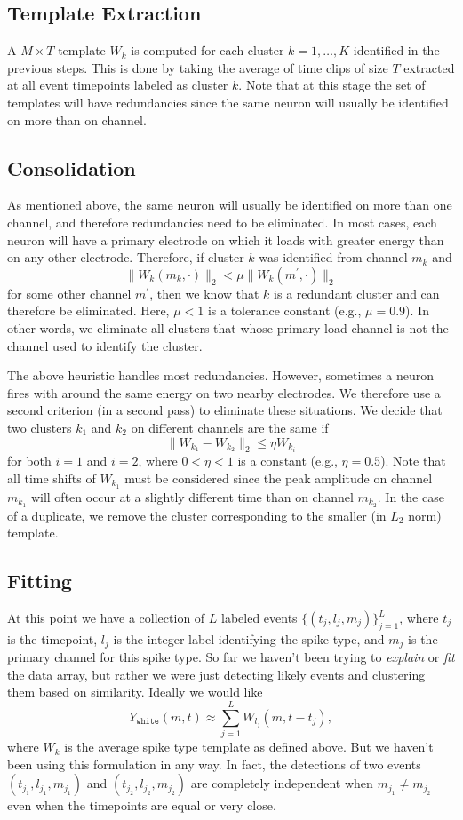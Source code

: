 \documentclass[hidelinks,10pt]{article}
\begin{document}
\subsection {Template Extraction}

A $M\times T$ template $W_k$ is computed for each cluster $k=1,\dots,K$ identified in the previous steps. This is done by taking the average of time clips of size $T$ extracted at all event timepoints labeled as cluster $k$. Note that at this stage the set of templates will have redundancies since the same neuron will usually be identified on more than on channel.

\subsection {Consolidation}

As mentioned above, the same neuron will usually be identified on more than one channel, and therefore redundancies need to be eliminated. In most cases, each neuron will have a primary electrode on which it loads with greater energy than on any other electrode. Therefore, if cluster $k$ was identified from channel $m_k$ and 
$$\|W_k(m_k,\cdot)\|_2<\mu \|W_k(m^\prime,\cdot)\|_2$$
for some other channel $m^\prime$, then we know that $k$ is a redundant cluster and can therefore be eliminated. Here, $\mu<1$ is a tolerance constant (e.g., $\mu=0.9$). In other words, we eliminate all clusters that whose primary load channel is not the channel used to identify the cluster.

The above heuristic handles most redundancies. However, sometimes a neuron fires with around the same energy on two nearby electrodes. We therefore use a second criterion (in a second pass) to eliminate these situations. We decide that two clusters $k_1$ and $k_2$ on different channels are the same if 
$$\|W_{k_1}-W_{k_2}\|_2\leq \eta W_{k_i}$$
for both $i=1$ and $i=2$, where $0<\eta<1$ is a constant (e.g., $\eta=0.5$). Note that all time shifts of $W_{k_1}$ must be considered since the peak amplitude on channel $m_{k_1}$ will often occur at a slightly different time than on channel $m_{k_2}$. In the case of a duplicate, we remove the cluster corresponding to the smaller (in $L_2$ norm) template.

\subsection {Fitting}

At this point we have a collection of $L$ labeled events $\{(t_j,l_j,m_j)\}_{j=1}^L$, where $t_j$ is the timepoint, $l_j$ is the integer label identifying the spike type, and $m_j$ is the primary channel for this spike type. So far we haven't been trying to \emph{explain} or \emph{fit} the data array, but rather we were just detecting likely events and clustering them based on similarity. Ideally we would like
$$Y_\texttt{white}(m,t)\approx\sum_{j=1}^L W_{l_j}(m,t-t_j),$$
where $W_k$ is the average spike type template as defined above.
But we haven't been using this formulation in any way. In fact, the detections of two events $(t_{j_1},l_{j_1},m_{j_1})$ and $(t_{j_2},l_{j_2},m_{j_2})$ are completely independent when $m_{j_1}\neq m_{j_2}$ even when the timepoints are equal or very close.
\end{document}
